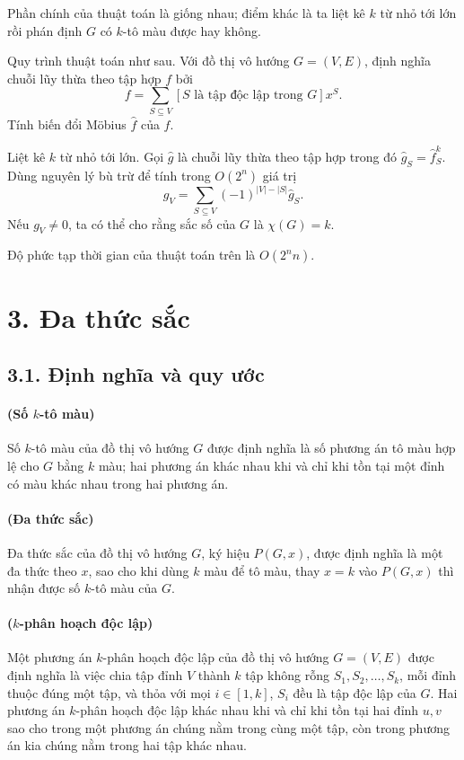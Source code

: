 \documentclass[11pt]{article}
\begin{document}
Phần chính của thuật toán là giống nhau; điểm khác là ta liệt kê \(k\) từ nhỏ
tới lớn rồi phán định \(G\) có \(k\)-tô màu được hay không.

Quy trình thuật toán như sau. Với đồ thị vô hướng \(G=(V,E)\), định nghĩa
chuỗi lũy thừa theo tập hợp \(f\) bởi
\[
  f=\sum_{S\subseteq V}[S\text{ là tập độc lập trong }G]x^S.
\]
Tính biến đổi Möbius \(\widehat f\) của \(f\).

Liệt kê \(k\) từ nhỏ tới lớn. Gọi \(\widehat g\) là chuỗi lũy thừa theo tập
hợp trong đó \(\widehat g_S=\widehat f_S^k\). Dùng nguyên lý bù trừ để tính
trong \(O(2^n)\) giá trị
\[
  g_V=\sum_{S\subseteq V}(-1)^{|V|-|S|}\widehat g_S.
\]
Nếu \(g_V\ne0\), ta có thể cho rằng sắc số của \(G\) là \(\chi(G)=k\).

Độ phức tạp thời gian của thuật toán trên là \(O(2^n n)\).

\section*{3. Đa thức sắc}

\subsection*{3.1. Định nghĩa và quy ước}

\paragraph{ (Số \(k\)-tô màu)}
Số \(k\)-tô màu của đồ thị vô hướng \(G\) được định nghĩa là số phương án tô
màu hợp lệ cho \(G\) bằng \(k\) màu; hai phương án khác nhau khi và chỉ khi
tồn tại một đỉnh có màu khác nhau trong hai phương án.

\paragraph{ (Đa thức sắc)}
Đa thức sắc của đồ thị vô hướng \(G\), ký hiệu \(P(G,x)\), được định nghĩa là
một đa thức theo \(x\), sao cho khi dùng \(k\) màu để tô màu, thay \(x=k\) vào
\(P(G,x)\) thì nhận được số \(k\)-tô màu của \(G\).

\paragraph{ (\(k\)-phân hoạch độc lập)}
Một phương án \(k\)-phân hoạch độc lập của đồ thị vô hướng \(G=(V,E)\) được
định nghĩa là việc chia tập đỉnh \(V\) thành \(k\) tập không rỗng
\(S_1,S_2,\ldots,S_k\), mỗi đỉnh thuộc đúng một tập, và thỏa với mọi
\(i\in[1,k]\), \(S_i\) đều là tập độc lập của \(G\). Hai phương án
\(k\)-phân hoạch độc lập khác nhau khi và chỉ khi tồn tại hai đỉnh \(u,v\) sao
cho trong một phương án chúng nằm trong cùng một tập, còn trong phương án kia
chúng nằm trong hai tập khác nhau.
\end{document}
